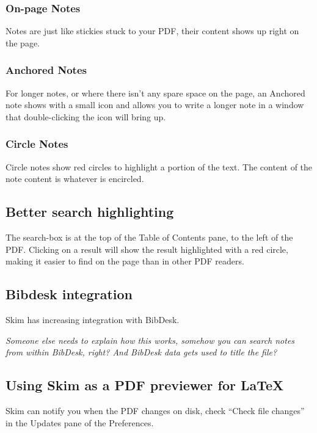 \documentclass[11pt]{article}
\begin{document}
\subsubsection{On-page Notes}

Notes are just like stickies stuck to your PDF, their content shows up right on the page.

\subsubsection{Anchored Notes}

For longer notes, or where there isn't any spare space on the page, an Anchored note shows with a small icon and allows you to write a longer note in a window that double-clicking the icon will bring up.

\subsubsection{Circle Notes}

Circle notes show red circles to highlight a portion of the text.  The content of the note content is whatever is encircled.

\subsection{Better search highlighting}

The search-box is at the top of the Table of Contents pane, to the left of the PDF.   Clicking on a result will show the result highlighted with a red circle, making it easier to find on the page than in other PDF readers.

\subsection{Bibdesk integration}

Skim has increasing integration with BibDesk.

\textit{Someone else needs to explain how this works, somehow you can search notes from within BibDesk, right?  And BibDesk data gets used to title the file?}

\subsection{Using Skim as a PDF previewer for \LaTeX}

Skim can notify you when the PDF changes on disk, check ``Check file changes'' in the Updates pane of the Preferences.
\end{document}
